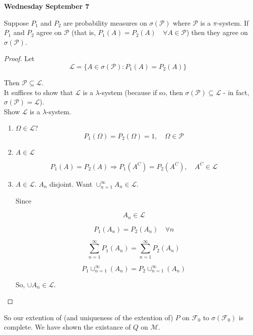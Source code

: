 \documentclass[11pt,fleqn]{book} %
\begin{document}
\textbf{Wednesday September 7}

\begin{theorem}
	Suppose $P_1$ and $P_2$ are probability measures on $\sigma(\mathscr{P})$ where $\mathscr{P}$ is a $\pi$-system. If $P_1$ and $P_2$ agree on $\mathscr{P}$ (that is, $P_1(A) = P_2(A) \quad \forall A \in \mathscr{P}$) then they agree on $\sigma(\mathscr{P})$.
\end{theorem}

\begin{proof}
	Let $$\mathscr{L} = \{A \in \sigma(\mathscr{P}): P_1(A) = P_2 (A) \}$$

	Then $\mathscr{P} \subseteq \mathscr{L}$.\\

	It suffices to show that $\mathscr{L}$ is a $\lambda$-system (because if so, then $\sigma(\mathscr{P}) \subseteq \mathscr{L}$ - in fact, $\sigma(\mathscr{P}) = \mathscr{L}$). \\

	Show $\mathscr{L}$ is a $\lambda$-system.\\

	\begin{enumerate}
		\item $\Omega \in \mathscr{L}$?
			$$P_1(\Omega) = P_2(\Omega) = 1, \quad \Omega \in \mathscr{P}$$

		\item $A \in \mathscr{L}$

		$$ P_1(A) = P_2(A) \Rightarrow P_1(A^C) = P_2(A^C), \quad A^C \in \mathscr{L}$$

		\item $A \in \mathscr{L}$. $A_n$ disjoint. Want $\cup^\infty_{n=1} A_n \in \mathscr{L}$.

		Since

		$$A_n \in \mathscr{L} $$

		$$P_1(A_n) = P_2(A_n) \quad \forall n$$

		$$\displaystyle \sum^\infty_{n=1} P_1(A_n) = \displaystyle \sum^\infty_{n=1} P_2(A_n) $$

		$$P_1 \displaystyle \cup^\infty_{n=1} (A_n) = P_2 \displaystyle \cup^\infty_{n=1} (A_n) $$

		So, $\cup A_n \in \mathscr{L}$.


	\end{enumerate}
\end{proof}

So our extention of (and uniqueness of the extention of) $P$ on $\mathscr{F}_0$ to $\sigma(\mathscr{F}_0)$ is complete. We have shown the existance of $Q$ on $\mathscr{M}$. \\
\end{document}

